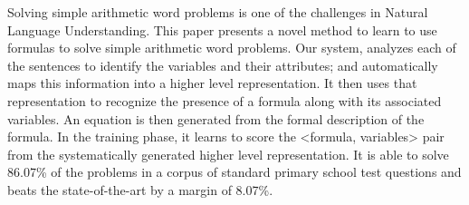 Solving simple arithmetic word problems is one of the challenges in Natural Language Understanding. This paper presents a novel method to learn to use formulas to solve simple arithmetic word problems. Our system, analyzes each of the sentences to identify the variables and their attributes; and automatically maps this information into a higher level representation. It then uses that representation to recognize the presence of a formula along with its associated variables. An equation is then generated from the formal description of the formula. In the training phase, it learns to score the <formula, variables> pair from the systematically generated higher level representation. It is able to solve 86.07\% of the problems in a corpus of standard primary school test questions and beats the state-of-the-art by a margin of 8.07\%.
